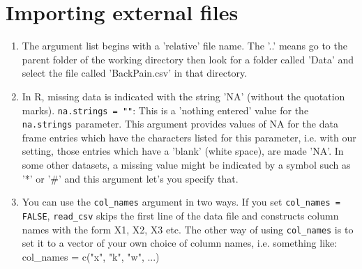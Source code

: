 \documentclass[titlepage]{book}\usepackage{knitr}
\begin{document}
\section{Importing external files}


\begin{knitrout}
\color{fgcolor}
\end{knitrout}


\begin{enumerate}
\item The argument list begins with a 'relative' file name. The '..' means go to the parent folder of the working directory then look for a folder  called 'Data' and select the file called 'BackPain.csv' in that directory.

\item In R, missing data is indicated with the string 'NA' (without the quotation marks). \texttt{na.strings = ""}: This is a 'nothing entered' value for the \texttt{na.strings} parameter.  This argument provides values of NA for the data frame entries which have the characters listed for this parameter, i.e. with our setting, those entries which have a 'blank' (white space), are made 'NA'. In some other datasets, a missing value might be indicated by a symbol such as '*' or '\#' and this argument let's you specify that.


\item You can use the \texttt{col\_names} argument in two ways. If you set \texttt{col\_names = FALSE}, \texttt{read\_csv} skips the first line of the data file and constructs column names with the form X1, X2, X3 etc. The other way of using \texttt{col\_names} is to set it to a vector of your own choice of column names, i.e. something like: {col\_names = c("x", "k", "w", ...)}

\end{enumerate}
\end{document}
